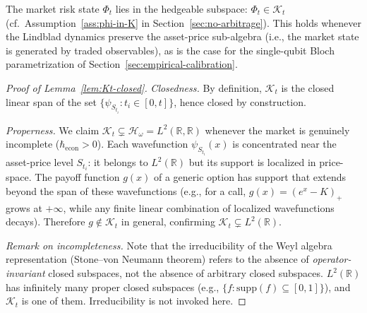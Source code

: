 \begin{assumption}\label{ass:phi-in-K-detail}
The market risk state $\Phi_t$ lies in the hedgeable subspace: $\Phi_t \in
\mathcal{K}_t$ (cf.\ Assumption~\ref{ass:phi-in-K} in Section~\ref{sec:no-arbitrage}).
This holds whenever the Lindblad dynamics preserve the
asset-price sub-algebra (i.e., the market state is generated by traded
observables), as is the case for the single-qubit Bloch parametrization
of Section~\ref{sec:empirical-calibration}.
\end{assumption}

\begin{proof}[Proof of Lemma~\ref{lem:Kt-closed}]
\emph{Closedness.} By definition, $\mathcal{K}_t$ is the closed linear span
of the set $\{\psi_{S_{t_i}} : t_i \in [0,t]\}$, hence closed by construction.

\emph{Properness.} We claim $\mathcal{K}_t \subsetneq \mathcal{H}_\omega =
L^2(\mathbb{R},\mathbb{R})$ whenever the market is genuinely incomplete
($\hbar_{\mathrm{econ}} > 0$). Each wavefunction $\psi_{S_{t_i}}(x)$ is
concentrated near the asset-price level $S_{t_i}$: it belongs to $L^2(\mathbb{R})$
but its support is localized in price-space. The payoff function $g(x)$ of a
generic option has support that extends beyond the span of these wavefunctions
(e.g., for a call, $g(x) = (e^x - K)_+$ grows at $+\infty$, while any finite
linear combination of localized wavefunctions decays). Therefore $g \notin
\mathcal{K}_t$ in general, confirming $\mathcal{K}_t \subsetneq L^2(\mathbb{R})$.

\emph{Remark on incompleteness.} Note that the irreducibility of the Weyl
algebra representation (Stone--von Neumann theorem) refers to the absence of
\emph{operator-invariant} closed subspaces, not the absence of arbitrary closed
subspaces. $L^2(\mathbb{R})$ has infinitely many proper closed subspaces (e.g.,
$\{f : \mathrm{supp}(f) \subseteq [0,1]\}$), and $\mathcal{K}_t$ is one of them.
Irreducibility is not invoked here.
\end{proof}

